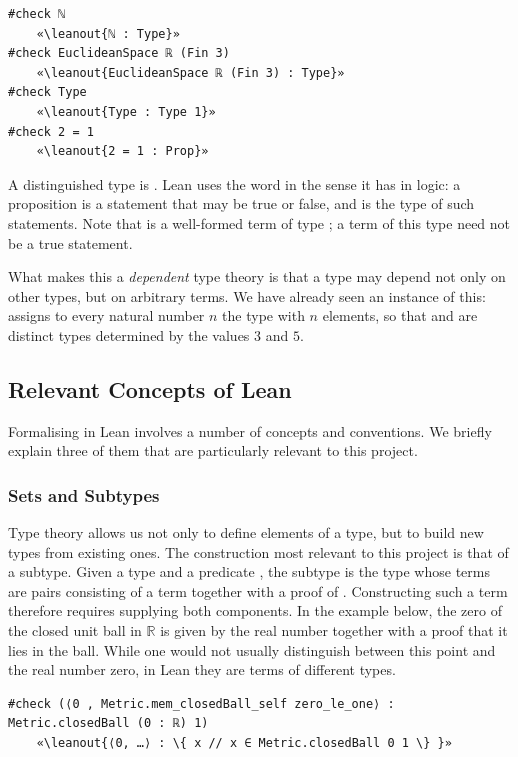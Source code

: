 \documentclass[11pt, a4paper, english]{article}
\newcommand{\leanout}[1]{{\normalfont\ttfamily\color{leanOutput} #1}}
\theoremstyle{plain}
\theoremstyle{definition}
\theoremstyle{remark}
\numberwithin{equation}{section}
\numberwithin{theorem}{section}
\begin{document}
\begin{verbatim}
#check ℕ
    «\leanout{ℕ : Type}»
#check EuclideanSpace ℝ (Fin 3)
    «\leanout{EuclideanSpace ℝ (Fin 3) : Type}»
#check Type
    «\leanout{Type : Type 1}»
#check 2 = 1
    «\leanout{2 = 1 : Prop}»
\end{verbatim}

A distinguished type is . Lean uses the word in the sense it has in logic: a proposition is a statement that may be true or false, and  is the type of such statements. Note that  is a well-formed term of type ; a term of this type need not be a true statement.

What makes this a \emph{dependent} type theory is that a type may depend not only on other types, but on arbitrary terms. We have already seen an instance of this:  assigns to every natural number $n$ the type with $n$ elements, so that  and  are distinct types determined by the values $3$ and $5$.

\subsection{Relevant Concepts of Lean} \label{subsec:concepts}
Formalising in Lean involves a number of concepts and conventions. We briefly explain three of them that are particularly relevant to this project.

\subsubsection*{Sets and Subtypes} 
Type theory allows us not only to define elements of a type, but to build new types from existing ones. The construction most relevant to this project is that of a subtype. Given a type  and a predicate , the subtype  is the type whose terms are pairs consisting of a term  together with a proof of . Constructing such a term therefore requires supplying both components. In the example below, the zero of the closed unit ball in $\mathbb{R}$ is given by the real number  together with a proof that it lies in the ball. While one would not usually distinguish between this point and the real number zero, in Lean they are terms of different types. 
\begin{verbatim}
#check (⟨0 , Metric.mem_closedBall_self zero_le_one⟩ : Metric.closedBall (0 : ℝ) 1)
    «\leanout{⟨0, …⟩ : \{ x // x ∈ Metric.closedBall 0 1 \} }»
\end{verbatim}
\end{document}
